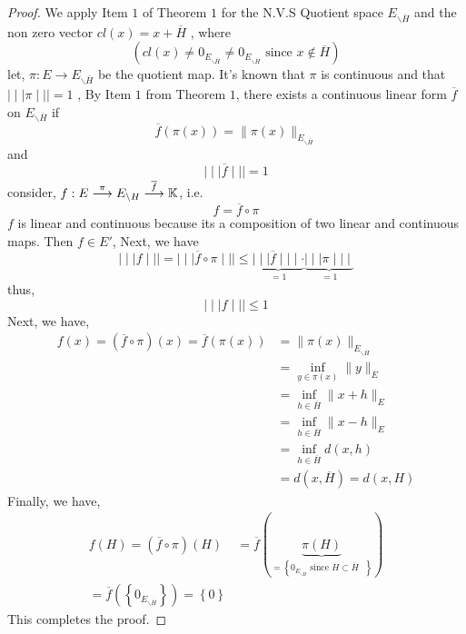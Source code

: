 \begin{proof}
We apply Item $1$ of Theorem $1$ for the N.V.S Quotient space
 $E_{ \backslash \overline{H}} $   and the non zero vector 
 $cl(x) = x + \overline{H}  $ , where 
 \[
 \left( 
	 cl (x) \neq  0_{E_{ \backslash \overline{H}}}  \neq 
	 0_{E_{ \backslash \overline{H}}} \text{ since } x
	 \notin \overline{H}
 \right)
 \]
 let,  
 $ \pi  : E \longrightarrow E_{ \backslash \overline{H}}$ be the quotient 
 map. It's known that $\pi  $ is continuous and that 
 $\mid \mid \mid  \pi  \mid \mid \mid  = 1$ , By Item $1 $ from Theorem $1 $, 
 there exists a continuous linear form $\overline{f} $ on 
 $E_{ \backslash \overline{H}} $  if 
 \[
	 \overline{f}(\pi (x) )  = \| \pi (x)  \|  _{E _{ \backslash \overline{H}}} 
 \]
 and 
 \[
 \mid \mid \mid  \overline{f} \mid \mid \mid  = 1
 \]
consider, 
$ f : E \overset{\pi }{\longrightarrow} E_{ \backslash H} \overset{
\overline{f}}{\longrightarrow} \mathbb{K}    $, i.e. 
\[
f = \overline{f}\circ \pi 
\]
$f $ is linear and continuous because its a composition of two linear 
and continuous maps. Then $f \in  E'$, Next, we have 
\[
\mid \mid \mid  f \mid \mid \mid  = \mid \mid \mid  \overline{f}
\circ  \pi \mid \mid \mid  \leq 
\underbrace{
\mid \mid \mid  \overline{f} \mid \mid \mid  \cdot 
}_{=1} 
\underbrace{
\mid \mid \mid  \pi  \mid \mid \mid 
}_{=1} 
\]
thus,
\[
\mid \mid \mid  f \mid \mid \mid  \leq 1
\]
Next, we have,
\begin{align*}
	f(x) = \left( 
		\overline{f}\circ \pi 
	\right)(x) = 
	\overline{f}(\pi (x) )  &=
	\| \pi (x)  \|  _{ E _{ \backslash \overline{H}}} \\
				&= \inf_{y \in  \pi (x)  }  
				\| y \| _{E}
				\\
				&= 
				\inf_{h \in  \overline{H}}  
				\| x+h \| _{E} \\
				&= \inf_{h \in  \overline{H}}  
				\| x -h \|  _{E} \\
				&= \inf_{h \in  \overline{H}}  
				d(x,h)  \\
				&= d (x, \overline{H})  = d(x,H) 
\end{align*}
Finally, we have, 
\begin{align*}
f(H) = 
\left( 
	\overline{f} \circ  \pi 
\right) (H)  &= 
\overline{f} \left( 
	\underbrace{
	\pi (H)  
	}_{ = \left\{ 0_{E _{ \backslash \overline{H}}}\text{ since $H \subset \overline{H} 
	$ }  \right\}} 
\right)
\\ = \overline{f}(
\left\{ 
0_{E _{ \backslash \overline{H}}}
\right\}
)  = 
\left\{ 0 \right\} 
\end{align*}
This completes the proof.
\end{proof}
